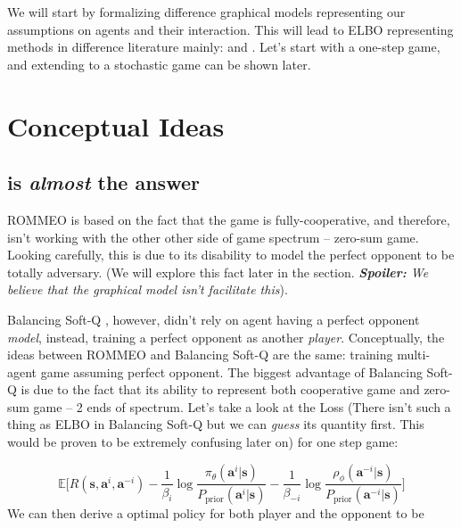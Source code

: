 We will start by formalizing difference graphical models representing our assumptions on agents and their interaction. This will lead to ELBO representing methods in difference literature mainly:  \cite{tian2019regularized} and \cite{grau2018balancing}. Let's start with a one-step game, and extending to a stochastic game can be shown later.

\section{Conceptual Ideas}
\subsection{\cite{grau2018balancing} is \emph{almost} the answer}
ROMMEO \cite{tian2019regularized} is based on the fact that the game is fully-cooperative, and therefore, isn't working with the other other side of game spectrum -- zero-sum game. Looking carefully, this is due to its disability to model the perfect opponent to be totally adversary. (We will explore this fact later in the section. \emph{\textbf{Spoiler:} We believe that the graphical model isn't facilitate this}). 

Balancing Soft-Q \cite{grau2018balancing}, however, didn't rely on agent having a perfect opponent \emph{model}, instead, training a perfect opponent as another \emph{player}. Conceptually, the ideas between ROMMEO and Balancing Soft-Q are the same: training multi-agent game assuming perfect opponent. The biggest advantage of Balancing Soft-Q is due to the fact that its ability to represent both cooperative game and zero-sum game -- 2 ends of spectrum. Let's take a look at the Loss (There isn't such a thing as ELBO in Balancing Soft-Q but we can \emph{guess} its quantity first. This would be proven to be extremely confusing later on) for one step game: 

\begin{equation}
    \mathbb{E}\Bigg[ R(\boldsymbol{s}, \boldsymbol{a}^i, \boldsymbol{a}^{-i}) - \frac{1}{\beta_i} \log \frac{\pi_{\theta}(\boldsymbol{a}^i | \boldsymbol{s})}{P_{\text{prior}}(\boldsymbol{a}^i | \boldsymbol{s})} - \frac{1}{\beta_{-i}} \log \frac{\rho_{\phi}(\boldsymbol{a}^{-i} | \boldsymbol{s})}{P_{\text{prior}}(\boldsymbol{a}^{-i} | \boldsymbol{s})}  \Bigg]
\end{equation}
We can then derive a optimal policy for both player and the opponent to be 

